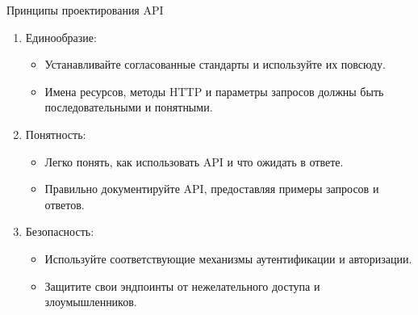 \documentclass[
  ignorenonframetext,
  aspectratio=169,
  aspectratio=169]{beamer}
\providecommand{\tightlist}{%
  \setlength{\itemsep}{0pt}\setlength{\parskip}{0pt}}
\begin{document}
\begin{frame}{Принципы проектирования API}
\protect\hypertarget{ux43fux440ux438ux43dux446ux438ux43fux44b-ux43fux440ux43eux435ux43aux442ux438ux440ux43eux432ux430ux43dux438ux44f-api}{}
\begin{enumerate}
\tightlist
\item
  Единообразие:

  \begin{itemize}
  \tightlist
  \item
    Устанавливайте согласованные стандарты и используйте их повсюду.
  \item
    Имена ресурсов, методы HTTP и параметры запросов должны быть
    последовательными и понятными.
  \end{itemize}
\item
  Понятность:

  \begin{itemize}
  \tightlist
  \item
    Легко понять, как использовать API и что ожидать в ответе.
  \item
    Правильно документируйте API, предоставляя примеры запросов и
    ответов.
  \end{itemize}
\item
  Безопасность:

  \begin{itemize}
  \tightlist
  \item
    Используйте соответствующие механизмы аутентификации и авторизации.
  \item
    Защитите свои эндпоинты от нежелательного доступа и злоумышленников.
  \end{itemize}
\end{enumerate}
\end{frame}
\end{document}
